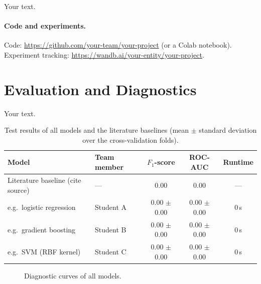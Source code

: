 \documentclass{article}
\begin{document}
Your text.

\paragraph{Code and experiments.}
Code: \url{https://github.com/your-team/your-project} (or a Colab notebook). \\
Experiment tracking: \url{https://wandb.ai/your-entity/your-project}.

\section{Evaluation and Diagnostics}

Your text.

\begin{table}[t]
  \caption{Test results of all models and the literature baselines (mean $\pm$ standard deviation over the cross-validation folds).}
  \label{tab:results}
  \centering
  \begin{tabular}{llccc}
    \toprule
    Model & Team member & $F_1$-score & ROC-AUC & Runtime \\
    \midrule
    Literature baseline (cite source)       & ---       & 0.00 & 0.00 & --- \\
    \midrule
    e.g.\ logistic regression               & Student A & 0.00 $\pm$ 0.00 & 0.00 $\pm$ 0.00 & 0\,s \\
    e.g.\ gradient boosting                 & Student B & 0.00 $\pm$ 0.00 & 0.00 $\pm$ 0.00 & 0\,s \\
    e.g.\ SVM (RBF kernel)                  & Student C & 0.00 $\pm$ 0.00 & 0.00 $\pm$ 0.00 & 0\,s \\
    \bottomrule
  \end{tabular}
\end{table}

\begin{figure}[t]
  \centering
  \caption{Diagnostic curves of all models.}
  \label{fig:diagnostics}
\end{figure}
\end{document}
